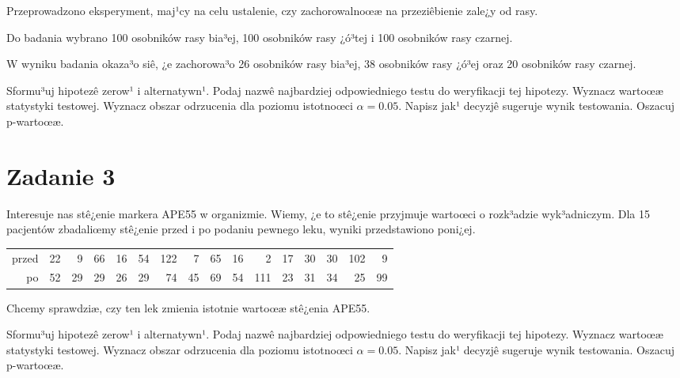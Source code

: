 \documentclass[a4paper,12pt]{article}
\begin{document}
  Przeprowadzono eksperyment, maj¹cy na celu ustalenie, czy zachorowalnoœæ na przeziêbienie zale¿y od rasy.
  
  Do badania wybrano 100 osobników rasy bia³ej, 100 osobników rasy ¿ó³tej i 100 osobników rasy czarnej. 
  
  W wyniku badania okaza³o siê, ¿e zachorowa³o 26 osobników rasy bia³ej, 38 osobników rasy ¿ó³ej oraz 20 osobników rasy czarnej. 
  
  Sformu³uj hipotezê zerow¹ i alternatywn¹. 
  Podaj nazwê najbardziej odpowiedniego testu do weryfikacji tej hipotezy. 
  Wyznacz wartoœæ statystyki testowej. 
  Wyznacz obszar odrzucenia dla poziomu istotnoœci $\alpha=0.05$. 
  Napisz jak¹ decyzjê sugeruje wynik testowania. Oszacuj p-wartoœæ. \vspace{1cm} 

  \section*{Zadanie 3}
     
  Interesuje nas stê¿enie markera APE55  w organizmie. 
  Wiemy, ¿e to stê¿enie przyjmuje wartoœci o rozk³adzie wyk³adniczym. 
  Dla 15 pacjentów zbadaliœmy stê¿enie przed i po podaniu pewnego leku, 
  wyniki przedstawiono poni¿ej.
  
  \vspace{0.5cm} 
  \noindent\begin{center} 
\begin{tabular}{rrrrrrrrrrrrrrrr}
  \hline
  \hline
przed & 22 & 9 & 66 & 16 & 54 & 122 & 7 & 65 & 16 & 2 & 17 & 30 & 30 & 102 & 9 \\
  po & 52 & 29 & 29 & 26 & 29 & 74 & 45 & 69 & 54 & 111 & 23 & 31 & 34 & 25 & 99 \\
   \hline
\end{tabular}
 
  \end{center} 
  \vspace{0.5cm}
  
  Chcemy sprawdziæ, czy ten lek zmienia istotnie wartoœæ stê¿enia APE55.
  
  Sformu³uj hipotezê zerow¹ i alternatywn¹. 
  Podaj nazwê najbardziej odpowiedniego testu do weryfikacji tej hipotezy. 
  Wyznacz wartoœæ statystyki testowej. 
  Wyznacz obszar odrzucenia dla poziomu istotnoœci $\alpha=0.05$. 
  Napisz jak¹ decyzjê sugeruje wynik testowania. Oszacuj p-wartoœæ. \vspace{1cm} 
\end{document}
